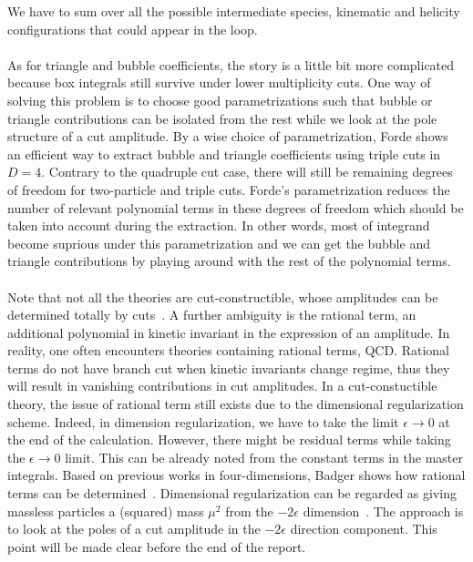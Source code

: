 We have to sum over all the possible intermediate species, kinematic and helicity configurations that could appear in the loop.
\\\\
As for triangle and bubble coefficients, the story is a little bit more complicated because box integrals still survive under lower multiplicity cuts.
One way of solving this problem is to choose good parametrizations such that bubble or triangle contributions can be isolated from the rest while we look at the pole structure of a cut amplitude.
By a wise choice of parametrization, Forde shows~\cite{Forde:2007mi} an efficient way to extract bubble and triangle coefficients using triple cuts in $D=4$.
Contrary to the quadruple cut case, there will still be remaining degrees of freedom for two-particle and triple cuts. 
Forde's parametrization reduces the number of relevant polynomial terms in these degrees of freedom which should be taken into account during the extraction. 
In other words, most of integrand become suprious under this parametrization and we can get the bubble and triangle contributions by playing around with the rest of the polynomial terms.
\\\\
Note that not all the theories are cut-constructible, \ie whose amplitudes can be determined totally by cuts~\cite{Bern:1994cg}. 
A further ambiguity is the rational term, \ie an additional polynomial in kinetic invariant in the expression of an amplitude. 
In reality, one often encounters theories containing rational terms, \ie QCD.
Rational terms do not have branch cut when kinetic invariants change regime, thus they will result in vanishing contributions in cut amplitudes.
In a cut-constuctible theory, the issue of rational term still exists due to the dimensional regularization scheme. 
Indeed, in dimension regularization, we have to take the limit $\epsilon\rightarrow 0$ at the end of the calculation. 
However, there might be residual terms while taking the $\epsilon\rightarrow 0$ limit. 
This can be already noted from the constant terms in the master integrals.
Based on previous works in four-dimensions, Badger shows how rational terms can be determined~\cite{Badger:2008cm}.
Dimensional regularization can be regarded as giving massless particles a (squared) mass $\mu^2$ from the $-2\epsilon$ dimension~\cite{Bern:1995db}.
The approach is to look at the poles of a cut amplitude in the $-2\epsilon$ direction component.
This point will be made clear before the end of the report.
\\\\
